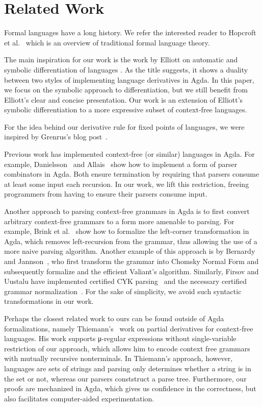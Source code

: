 \section{Related Work}\label{sec:related-work}

Formal languages have a long history. We refer the interested reader to Hopcroft
et al.~\cite{hopcroft-book} which is an overview of traditional formal language
theory.

The main inspiration for our work is the work by Elliott on automatic and
symbolic differentiation of languages \cite{conal-languages}. As the title
suggests, it shows a duality between two styles of implementing language
derivatives in Agda. In this paper, we focus on the symbolic approach to
differentiation, but we still benefit from Elliott's clear and concise
presentation. Our work is an extension of Elliott's symbolic differentiation to
a more expressive subset of context-free languages.

For the idea behind our derivative rule for fixed points of languages, we were
inspired by Grenrus's blog post~\cite{fix-ing-regular-expressions}.

Previous work has implemented context-free (or similar) languages in Agda. For
example, Danielsson~\cite{total-parser-combinators} and Allais~\cite{agdarsec}
show how to implement a form of parser combinators in Agda. Both ensure
termination by requiring that parsers consume at least some input each
recursion. In our work, we lift this restriction, freeing programmers from
having to ensure their parsers consume input.

Another approach to parsing context-free grammars in Agda is to first convert
arbitrary context-free grammars to a form more amenable to parsing. For example,
Brink et al.~\cite{dependently-typed-grammars} show how to formalize the
left-corner transformation in Agda, which removes left-recursion from the
grammar, thus allowing the use of a more naive parsing algorithm. Another
example of this approach is by Bernardy and Jannson~\cite{certified-valiant},
who first transform the grammar into Chomsky Normal Form and subsequently
formalize and the efficient Valiant's algorithm.
Similarly, Firsov and Uustalu have implemented certified CYK parsing~\cite{cyk-parsing} and the necessary certified grammar normalization~\cite{firsov-uustalu}.
For the sake of simplicity, we avoid such syntactic transformations in our
work.

Perhaps the closest related work to ours can be found outside of Agda
formalizations, namely Thiemann's~\cite{Thiemann17} work on partial derivatives
for context-free languages.
His work supports μ-regular expressions without single-variable restriction of
our approach, which allows him to encode context free grammars with mutually
recursive nonterminals.
In Thiemann's approach, however, languages are sets of strings and parsing only
determines whether a string is in the set or not, whereas our parsers
conststruct a parse tree.
Furthermore, our proofs are mechanized in Agda, which gives us confidence in the
correctness, but also facilitates computer-aided experimentation.

